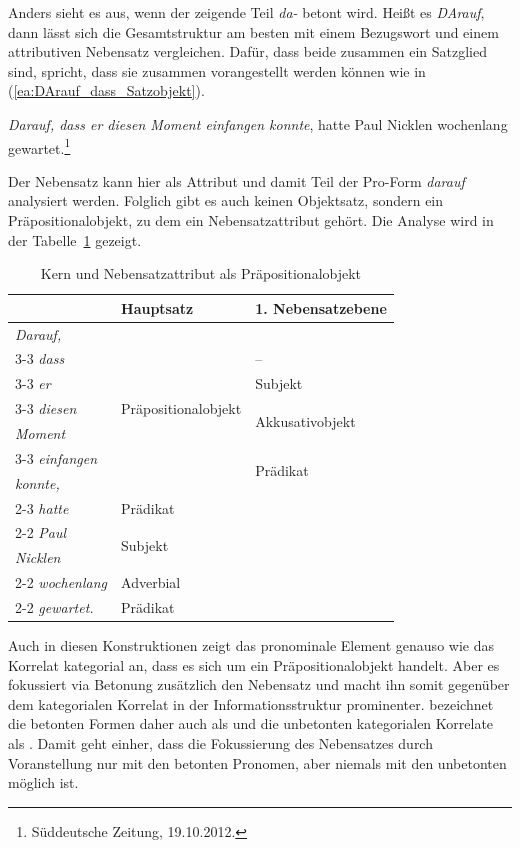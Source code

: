 Anders sieht es aus, wenn der zeigende Teil \textit{da-} betont wird. Heißt es \textit{DArauf}, dann lässt sich die Gesamtstruktur am besten mit einem Bezugswort und einem attributiven Nebensatz vergleichen. Dafür, dass beide zusammen ein Satzglied sind, spricht, dass sie zusammen vorangestellt werden können wie in (\ref{ea:DArauf_dass_Satzobjekt}).

\ea \label{ea:DArauf_dass_Satzobjekt} \textit{Darauf, dass er diesen Moment einfangen konnte}, hatte Paul Nicklen wochenlang gewartet.\footnote{Süddeutsche Zeitung, 19.10.2012.}
\z 

Der Nebensatz kann hier als Attribut und damit Teil der Pro-Form \textit{darauf} analysiert werden. Folglich gibt es auch keinen Objektsatz, sondern ein Präpositionalobjekt, zu dem ein Nebensatzattribut gehört. Die Analyse wird in der Tabelle~\ref{tab:ProPräp_NeSa_Atrribut} gezeigt. 

\begin{table}
  \centering
  \begin{tabular}{l|l|l}
      &  Hauptsatz   &  1. Nebensatzebene \\
    \hline
    \textit{Darauf,} & \multirow{7}{*}{Präpositionalobjekt} & \\ \cline{3-3}
    \textit{dass} &  & -- \\ \cline{3-3}
    \textit{er} & & Subjekt  \\ \cline{3-3} 
    \textit{diesen} & & \multirow{2}{*}{Akkusativobjekt} \\  
    \textit{Moment} & & \\ \cline{3-3}
    \textit{einfangen} & & \multirow{2}{*}{Prädikat} \\ 
    \textit{konnte,} & & \\ \cline{2-3}
    \textit{hatte} & Prädikat & \\ \cline{2-2}
    \textit{Paul} & \multirow{2}{*}{Subjekt} \\ 
    \textit{Nicklen} & & \\ \cline{2-2}
    \textit{wochenlang} & Adverbial & \\ \cline{2-2}
    \textit{gewartet.} & Prädikat & \\ 
    \hline 
  \end{tabular}
  \caption{Kern und Nebensatzattribut als Präpositionalobjekt}
  \label{tab:ProPräp_NeSa_Atrribut}
\end{table}

Auch in diesen Konstruktionen zeigt das pronominale Element genauso wie das Korrelat kategorial an, dass es sich um ein Präpositionalobjekt handelt. Aber es fokussiert via Betonung zusätzlich den Nebensatz und macht ihn somit gegenüber dem kategorialen Korrelat in der Informationsstruktur prominenter. \citet[592]{Agel2017} bezeichnet die betonten Formen daher auch als  und die unbetonten kategorialen Korrelate als . Damit geht einher, dass die Fokussierung des Nebensatzes durch Voranstellung nur mit den betonten Pronomen, aber niemals mit den unbetonten möglich ist. 

